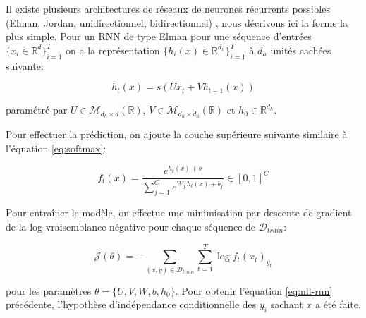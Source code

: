 Il existe plusieurs architectures de réseaux de neurones récurrents possibles
(Elman, Jordan, unidirectionnel, bidirectionnel) \citep{rnn15}, nous
décrivons ici la forme la plus simple. Pour un RNN de type Elman pour une séquence
d'entrées $\lbrace x_{i}\in\mathbb{R}^{d}\rbrace_{i=1}^{T}$ on a la
représentation $\lbrace h_{i}(x)\in\mathbb{R}^{d_h}\rbrace_{i=1}^{T}$ à $d_h$
unités cachées suivante:

\begin{equation}
h_t(x) = s(Ux_{t}+Vh_{t-1}(x))
\end{equation}

paramétré par $U\in\mathcal{M}_{d_h\times d}(\mathbb{R})$,
$V\in\mathcal{M}_{d_h\times d_h}(\mathbb{R})$ et $h_{0}\in\mathbb{R}^{d_h}$.

Pour effectuer la prédiction, on ajoute la couche supérieure suivante similaire à l'équation \ref{eq:softmax}:

\begin{equation}
f_{t}(x) = \frac{e^{ h_{t}(x) + b}}{\sum_{j=1}^C e^{W_{j.} h_{t}(x) + b_{j} }} \in [0,1]^{C}
\end{equation}

Pour entraîner le modèle, on effectue une minimisation par descente de gradient
de la log-vraisemblance négative pour chaque séquence de $\mathcal{D}_{train}$:

\begin{equation}
\label{eq:nll-rnn}
\mathcal{J}(\theta) = - \sum_{(x,y)\in\mathcal{D}_{train}} \sum_{t=1}^{T}\log f_{t}(x_{t})_{y_{t}}
\end{equation}

pour les paramètres $\theta=\lbrace U, V, W, b, h_{0}\rbrace$. Pour obtenir
l'équation \ref{eq:nll-rnn} précédente, l'hypothèse d'indépendance
conditionnelle des $y_i$ sachant $x$ a été faite.
